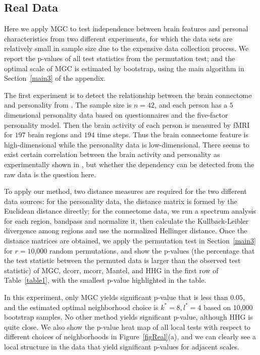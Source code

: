\documentclass[11pt]{article}
\begin{document}
\subsection{Real Data}
\label{numer3}
Here we apply MGC to test independence between brain features and personal characteristics from two different experiments, for which the data sets are relatively small in sample size due to the expensive data collection process. We report the p-values of all test statistics from the permutation test; and the optimal scale of MGC is estimated by bootstrap, using the main algorithm in Section~\ref{main3} of the appendix.

The first experiment is to detect the relationship between the brain connectome and personality from \cite{AdelsteinEtAl2011}. The sample size is $n=42$, and each person has a $5$ dimensional personality data based on questionnaires and the five-factor personality model. Then the brain activity of each person is measured by fMRI for $197$ brain regions and $194$ time steps. Thus the brain connectome feature is high-dimensional while the personality data is low-dimensional. There seems to exist certain correlation between the brain activity and personality as experimentally shown in \cite{AdelsteinEtAl2011}, but whether the dependency can be detected from the raw data is the question here.

To apply our method, two distance measures are required for the two different data sources: for the personality data, the distance matrix is formed by the Euclidean distance directly; for the connectome data, we run a spectrum analysis for each region, bandpass and normalize it, then calculate the Kullback-Leibler divergence among regions and use the normalized Hellinger distance. Once the distance matrices are obtained, we apply the permutation test in Section~\ref{main3} for $r=10$,$000$ random permutations, and show the p-values (the percentage that the test statistic between the permuted data is larger than the observed test statistic) of MGC, dcorr, mcorr, Mantel, and HHG in the first row of Table~\ref{table1}, with the smallest p-value highlighted in the table.

In this experiment, only MGC yields significant p-value that is less than $0.05$, and the estimated optimal neighborhood choice is $k^{*}=8, l^{*}=4$ based on $10$,$000$ bootstrap samples. No other method yields significant p-value, although HHG is quite close. We also show the p-value heat map of all local tests with respect to different choices of neighborhoods in Figure~\ref{figReal}(a), and we can clearly see a local structure in the data that yield significant p-values for adjacent scales.
\end{document}
